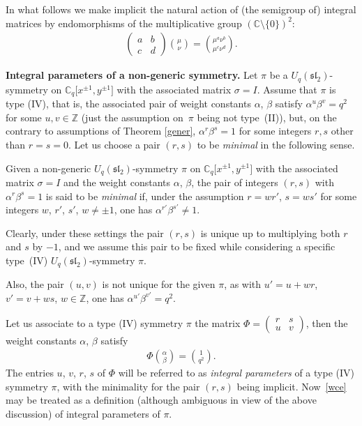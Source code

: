 \documentclass[10pt,a4paper]{amsart}
\numberwithin{equation}{section}
\begin{document}
In what follows we make implicit the natural action of (the semigroup of) integral matrices by endomorphisms of the multiplicative group $(\mathbb{C}{\setminus}\{0\})^2$:
\begin{gather}
\begin{pmatrix}a & b\\ c & d\end{pmatrix}\binom\mu\nu=\binom{\mu^a\nu^b}{\mu^c\nu^d}. \label{*}
\end{gather}

{\bf Integral parameters of a non-generic symmetry.} Let $\pi$ be a $U_q(\mathfrak{sl}_2)$-symmetry on $\mathbb{C}_q\big[x^{\pm 1},y^{\pm 1}\big]$ with the associated matrix $\sigma=I$. Assume that $\pi$ is type (IV), that is, the associated pair of weight constants $\alpha$, $\beta$ satisfy $\alpha^u\beta^v=q^2$ for some $u,v\in\mathbb{Z}$ (just the assumption on~$\pi$ being not type~(II)), but, on the contrary to assumptions of Theorem \ref{gener}, $\alpha^r\beta^s=1$ for some integers $r,s$ other than $r=s=0$. Let us choose a pair $(r,s)$ to be {\it minimal} in the following sense.

\begin{Definition}Given a non-generic $U_q(\mathfrak{sl}_2)$-symmetry $\pi$ on $\mathbb{C}_q\big[x^{\pm 1},y^{\pm 1}\big]$ with the associated matrix $\sigma=I$ and the weight constants $\alpha$, $\beta$, the pair of integers $(r,s)$ with $\alpha^r\beta^s=1$ is said to be {\it minimal} if, under the assumption $r=wr'$, $s=ws'$ for some integers $w$, $r'$, $s'$, $w\ne\pm 1$, one has $\alpha^{r'}\beta^{s'}\ne 1$.
\end{Definition}

Clearly, under these settings the pair $(r,s)$ is unique up to multiplying both $r$ and $s$ by $-1$, and we assume this pair to be fixed while considering a specific type~(IV) $U_q(\mathfrak{sl}_2)$-symmetry $\pi$.

Also, the pair $(u,v)$ is not unique for the given $\pi$, as with $u'=u+wr$, $v'=v+ws$, $w\in\mathbb{Z}$, one has $\alpha^{u'}\beta^{v'}=q^2$.

Let us associate to a type (IV) symmetry $\pi$ the matrix $\Phi=\left(\begin{smallmatrix}r & s\\ u & v\end{smallmatrix}\right)$, then
the weight constants $\alpha$, $\beta$ satisfy
\begin{gather}\label{wce}
\Phi\binom{\alpha}{\beta}=\binom{1}{q^2}.
\end{gather}
The entries $u$, $v$, $r$, $s$ of $\Phi$ will be referred to as {\it integral parameters} of a type (IV) symmetry $\pi$, with the minimality for the pair $(r,s)$ being implicit. Now~\eqref{wce} may be treated as a definition (although ambiguous in view of the above discussion) of integral parameters of $\pi$.
\end{document}
